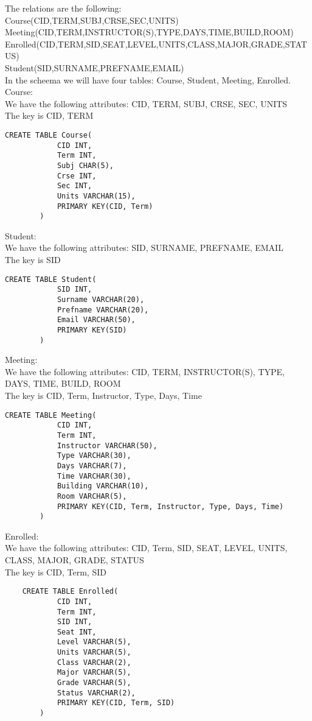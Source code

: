 

The relations are the following: \\

Course(CID,TERM,SUBJ,CRSE,SEC,UNITS) \\
Meeting(CID,TERM,INSTRUCTOR(S),TYPE,DAYS,TIME,BUILD,ROOM) \\
Enrolled(CID,TERM,SID,SEAT,LEVEL,UNITS,CLASS,MAJOR,GRADE,STATUS) \\
Student(SID,SURNAME,PREFNAME,EMAIL) \\

In the scheema we will have four tables: Course, Student, Meeting, Enrolled. \\

Course: \\
We have the following attributes: CID, TERM, SUBJ, CRSE, SEC, UNITS \\
The key is CID, TERM \\
\begin{verbatim}
CREATE TABLE Course(
			CID INT,
			Term INT,
			Subj CHAR(5),
			Crse INT,
			Sec INT,
			Units VARCHAR(15),
			PRIMARY KEY(CID, Term)
		)
\end{verbatim}

Student: \\
We have the following attributes: SID, SURNAME, PREFNAME, EMAIL \\
The key is SID \\

\begin{verbatim}
CREATE TABLE Student(
			SID INT,
			Surname VARCHAR(20),
			Prefname VARCHAR(20),
			Email VARCHAR(50),
			PRIMARY KEY(SID)
		)
\end{verbatim}


Meeting:\\
We have the following attributes: CID, TERM, INSTRUCTOR(S), TYPE, DAYS, TIME, BUILD, ROOM\\
The key is CID, Term, Instructor, Type, Days, Time \\


\begin{verbatim}
CREATE TABLE Meeting(
			CID INT,
			Term INT,
			Instructor VARCHAR(50),
			Type VARCHAR(30),
			Days VARCHAR(7),
			Time VARCHAR(30),
			Building VARCHAR(10),
			Room VARCHAR(5),
			PRIMARY KEY(CID, Term, Instructor, Type, Days, Time)
		)
\end{verbatim}

Enrolled: \\
We have the following attributes:  CID, Term, SID, SEAT, LEVEL, UNITS, CLASS, MAJOR, GRADE, STATUS \\
The key is CID, Term, SID \\


\begin{verbatim}
	CREATE TABLE Enrolled(
			CID INT,
			Term INT,
			SID INT,
			Seat INT,
			Level VARCHAR(5),
			Units VARCHAR(5),
			Class VARCHAR(2),
			Major VARCHAR(5),
			Grade VARCHAR(5),
			Status VARCHAR(2),
			PRIMARY KEY(CID, Term, SID)
		)
\end{verbatim}


